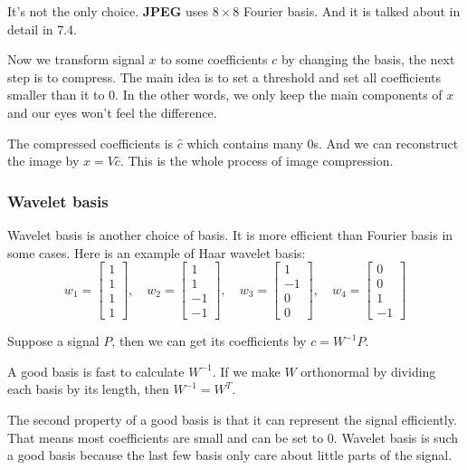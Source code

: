 \documentclass[12pt]{ctexart}
\begin{document}
It's not the only choice. \textbf{JPEG} uses $8 \times 8$ Fourier basis. And it is talked
about in detail in 7.4.

Now we transform signal $x$ to some coefficients $c$ by changing the basis, the next step
is to compress. The main idea is to set a threshold and set all coefficients smaller than it
to 0. In the other words, we only keep the main components of $x$ and our eyes won't feel
the difference.

The compressed coefficients is $\hat{c}$ which contains many 0s. And we can reconstruct
the image by $\hat{x} = V\hat{c}$. This is the whole process of image compression.

\subsubsection{\textbf{Wavelet basis}}

Wavelet basis is another choice of basis. It is more efficient than Fourier basis in
some cases. Here is an example of Haar wavelet basis:
\[
  w_1 = \begin{bmatrix}
    1 \\ 1 \\ 1 \\ 1
  \end{bmatrix}, \quad
  w_2 = \begin{bmatrix}
    1 \\ 1 \\ -1 \\ -1
  \end{bmatrix}, \quad
  w_3 = \begin{bmatrix}
    1 \\ -1 \\ 0 \\ 0
  \end{bmatrix}, \quad
  w_4 = \begin{bmatrix}
    0 \\ 0 \\ 1 \\ -1
  \end{bmatrix}
\]

Suppose a signal $P$, then we can get its coefficients by $c = W^{-1}P$.

A good basis is fast to calculate $W^{-1}$. If we make $W$ orthonormal by dividing each
basis by its length, then $W^{-1} = W^{T}$.

The second property of a good basis is that it can represent the signal efficiently. That means
most coefficients are small and can be set to 0. Wavelet basis is such a good basis because
the last few basis only care about little parts of the signal.
\end{document}

